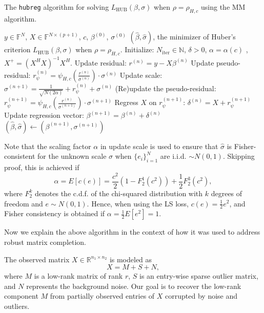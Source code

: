 \begin{algorithm}[H]
\caption{The \texttt{hubreg} algorithm for solving $L_{\text{HUB}}(\beta, \sigma)$ when $\rho = \rho_{H,c}$ using the MM algorithm.}
\begin{algorithmic}[1]
\Require $y \in \mathbb{F}^N$, $X \in \mathbb{F}^{N \times (p+1)}$, $c$, $\beta^{(0)}$, $\sigma^{(0)}$
\Ensure $(\hat{\beta}, \hat{\sigma})$, the minimizer of Huber’s criterion $L_{\text{HUB}}(\beta, \sigma)$ when $\rho = \rho_{H,c}$.
\State Initialize: $N_{\text{iter}} \in \mathbb{N}$, $\delta > 0$, $\alpha = \alpha(c)$ , $X^+ = (X^HX)^{-1}X^H$.
    \State Update residual: $r^{(n)} = y - X\beta^{(n)}$
    \State Update pseudo-residual: $r_{\psi}^{(n)} = \psi_{H,c}\left(\frac{r^{(n)}}{\sigma^{(n)}}\right) \cdot \sigma^{(n)}$
    \State Update scale: $\sigma^{(n+1)} = \frac{1}{\sqrt{N(2\alpha)}} + r_{\psi}^{(n)} + \sigma^{(n)}$
    \State (Re)update the pseudo-residual: $r_{\psi}^{(n+1)} = \psi_{H,c}\left(\frac{r^{(n)}}{\sigma^{(n+1)}}\right) \cdot \sigma^{(n+1)}$
    \State Regress $X$ on $r_{\psi}^{(n+1)}$: $\delta^{(n)} = X + r_{\psi}^{(n+1)}$
    \State Update regression vector: $\beta^{(n+1)} = \beta^{(n)} + \delta^{(n)}$
        \State \Return $(\hat{\beta}, \hat{\sigma}) \gets (\beta^{(n+1)}, \sigma^{(n+1)})$
    \EndIf
\EndFor
\end{algorithmic}
\label{algo: 3}
\end{algorithm}

Note that the scaling factor $\alpha$ in update scale is used to ensure that $\hat{\sigma}$ is Fisher-consistent for the unknown scale $\sigma$ when $\{e_i\}_{i=1}^N$ are i.i.d. $\sim N(0, 1)$. Skipping proof, this is achieved if
\begin{equation}
\alpha = E[c(e)] = \frac{c^2}{2} \left(1 - F_2^1(c^2)\right) + \frac{1}{2} F_2^3(c^2), \tag{8}
\end{equation}
where $F_2^k$ denotes the c.d.f. of the chi-squared distribution with $k$ degrees of freedom and $e \sim N(0, 1)$. Hence, when using the LS loss, $c(e) = \frac{1}{2} e^2$, and Fisher consistency is obtained if $\alpha = \frac{1}{2}E[e^2] = 1$.

Now we explain the above algorithm in the context of how it was used to address robust matrix completion. 

The observed matrix $X \in \mathbb{R}^{n_1 \times n_2}$ is modeled as
\[
X = M + S + N,
\]
where $M$ is a low-rank matrix of rank $r$, $S$ is an entry-wise sparse outlier matrix, and $N$ represents the background noise. Our goal is to recover the low-rank component $M$ from partially observed entries of $X$ corrupted by noise and outliers.

